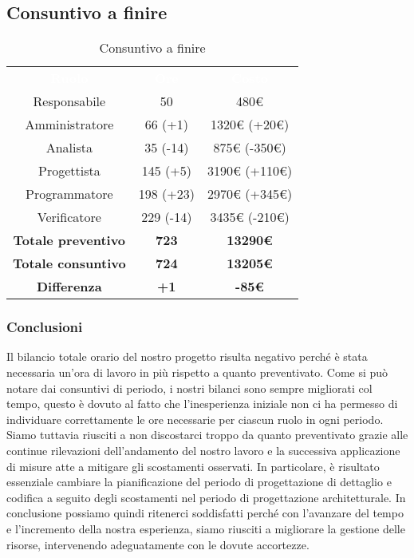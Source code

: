 \subsection{Consuntivo a finire}
\begin{table}[H]
\centering\renewcommand{\arraystretch}{1.5}
\caption{Consuntivo a finire}
\vspace{0.2cm}
\begin{tabular}{ c c c }
\rowcolor{redafk}
\textcolor{white}{\textbf{Ruolo}} & \textcolor{white}{\textbf{Ore}} &
\textcolor{white}{\textbf{Costo}}  \\
Responsabile 	& 50 & 480€ \\
Amministratore 	& 66 (+1)  & 1320€ (+20€)\\
Analista 		&  35 (-14) & 875€ (-350€) \\
Progettista		&  145 (+5) & 3190€ (+110€) \\
Programmatore	&  198 (+23) & 2970€ (+345€) \\
Verificatore 	&  229 (-14) & 3435€ (-210€) \\
\textbf{Totale preventivo} & \textbf{723} & \textbf{13290€}  \\
\textbf{Totale consuntivo} &  \textbf{724}& \textbf{13205€} \\
\rowcolor{lastrowcolor}
\textbf{Differenza} & \textbf{+1} & \textbf{-85€} \\
\end{tabular}
\end{table}

\subsubsection{Conclusioni}
Il bilancio totale orario del nostro progetto risulta negativo perché è stata
necessaria un’ora di lavoro in più rispetto a quanto preventivato.
Come si può notare dai consuntivi di periodo, i nostri bilanci sono sempre
migliorati col tempo, questo è dovuto al fatto che l’inesperienza iniziale non
ci ha permesso di individuare correttamente le ore necessarie per ciascun
ruolo in ogni periodo. Siamo tuttavia riusciti a non discostarci troppo da
quanto preventivato grazie alle continue rilevazioni dell’andamento del nostro
lavoro e la successiva applicazione di misure atte a mitigare gli scostamenti
osservati. In particolare, è risultato essenziale cambiare la pianificazione del
periodo di progettazione di dettaglio e codifica a seguito degli scostamenti
nel periodo di progettazione architetturale.
In conclusione possiamo quindi ritenerci soddisfatti perché con l’avanzare del tempo e l’incremento della nostra esperienza, siamo riusciti a migliorare la gestione delle risorse, intervenendo adeguatamente con le dovute accortezze.

